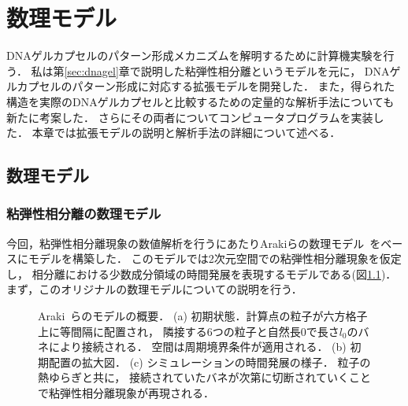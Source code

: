 \chapter{数理モデル}
\label{sec:model}

DNAゲルカプセルのパターン形成メカニズムを解明するために計算機実験を行う．
私は第\ref{sec:dnagel}章で説明した粘弾性相分離というモデルを元に，
DNAゲルカプセルのパターン形成に対応する拡張モデルを開発した．
また，得られた構造を実際のDNAゲルカプセルと比較するための定量的な解析手法についても新たに考案した．
さらにその両者についてコンピュータプログラムを実装した．
本章では拡張モデルの説明と解析手法の詳細について述べる．


\section{数理モデル}


\subsection{粘弾性相分離の数理モデル}
今回，粘弾性相分離現象の数値解析を行うにあたりArakiらの数理モデル~\cite{araki2005simple}をベースにモデルを構築した．
このモデルでは2次元空間での粘弾性相分離現象を仮定し，
相分離における少数成分領域の時間発展を表現するモデルである(図\ref{fig:model_2d})．
まず，このオリジナルの数理モデルについての説明を行う．
\begin{figure}
\centering

\caption{
    Araki~\cite{araki2005simple}らのモデルの概要．
    (a) 初期状態．計算点の粒子が六方格子上に等間隔に配置され，
        隣接する6つの粒子と自然長$0$で長さ$l_0$のバネにより接続される．
        空間は周期境界条件が適用される．
    (b) 初期配置の拡大図．
    (c) シミュレーションの時間発展の様子．
        粒子の熱ゆらぎと共に，
        接続されていたバネが次第に切断されていくことで粘弾性相分離現象が再現される．
}
\label{fig:model_2d}
\end{figure}

